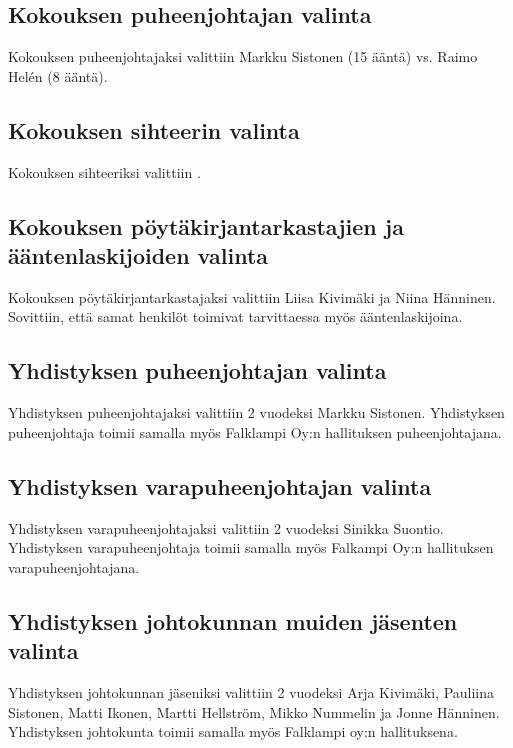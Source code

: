\documentclass[a4paper,12pt]{article}
\begin{document}
\subsection{Kokouksen puheenjohtajan valinta}
Kokouksen puheenjohtajaksi valittiin Markku Sistonen (15 ääntä) vs. Raimo Helén (8 ääntä).
\subsection{Kokouksen sihteerin valinta}
Kokouksen sihteeriksi valittiin .
\subsection{Kokouksen pöytäkirjantarkastajien ja ääntenlaskijoiden valinta}
Kokouksen pöytäkirjantarkastajaksi valittiin Liisa Kivimäki ja Niina Hänninen. Sovittiin, että samat henkilöt toimivat tarvittaessa myös ääntenlaskijoina.
\subsection{Yhdistyksen puheenjohtajan valinta}
Yhdistyksen puheenjohtajaksi valittiin 2 vuodeksi Markku Sistonen. Yhdistyksen puheenjohtaja toimii samalla myös Falklampi Oy:n hallituksen puheenjohtajana.
\subsection{Yhdistyksen varapuheenjohtajan valinta}
Yhdistyksen varapuheenjohtajaksi valittiin 2 vuodeksi Sinikka Suontio. Yhdistyksen varapuheenjohtaja toimii samalla myös Falkampi Oy:n hallituksen varapuheenjohtajana.
\subsection{Yhdistyksen johtokunnan muiden jäsenten valinta}
Yhdistyksen johtokunnan jäseniksi valittiin 2 vuodeksi Arja Kivimäki, Pauliina Sistonen, Matti Ikonen, Martti Hellström, Mikko Nummelin ja Jonne Hänninen. Yhdistyksen johtokunta toimii samalla myös Falklampi oy:n hallituksena.
\end{document}
